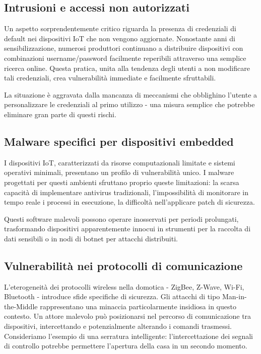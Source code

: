 \subsection{Intrusioni e accessi non autorizzati}

Un aspetto sorprendentemente critico riguarda la presenza di credenziali di default nei dispositivi IoT che non vengono aggiornate. Nonostante anni di sensibilizzazione, numerosi produttori continuano a distribuire dispositivi con combinazioni username/password facilmente reperibili attraverso una semplice ricerca online. Questa pratica, unita alla tendenza degli utenti a non modificare tali credenziali, crea vulnerabilità immediate e facilmente sfruttabili.

La situazione è aggravata dalla mancanza di meccanismi che obblighino l'utente a personalizzare le credenziali al primo utilizzo - una misura semplice che potrebbe eliminare gran parte di questi rischi.

\subsection{Malware specifici per dispositivi embedded}

I dispositivi IoT, caratterizzati da risorse computazionali limitate e sistemi operativi minimali, presentano un profilo di vulnerabilità unico. I malware progettati per questi ambienti sfruttano proprio queste limitazioni: la scarsa capacità di implementare antivirus tradizionali, l'impossibilità di monitorare in tempo reale i processi in esecuzione, la difficoltà nell'applicare patch di sicurezza.

Questi software malevoli possono operare inosservati per periodi prolungati, trasformando dispositivi apparentemente innocui in strumenti per la raccolta di dati sensibili o in nodi di botnet per attacchi distribuiti.

\subsection{Vulnerabilità nei protocolli di comunicazione}

L'eterogeneità dei protocolli wireless nella domotica - ZigBee, Z-Wave, Wi-Fi, Bluetooth - introduce sfide specifiche di sicurezza. Gli attacchi di tipo Man-in-the-Middle rappresentano una minaccia particolarmente insidiosa in questo contesto. Un attore malevolo può posizionarsi nel percorso di comunicazione tra dispositivi, intercettando e potenzialmente alterando i comandi trasmessi. Consideriamo l'esempio di una serratura intelligente: l'intercettazione dei segnali di controllo potrebbe permettere l'apertura della casa in un secondo momento.

